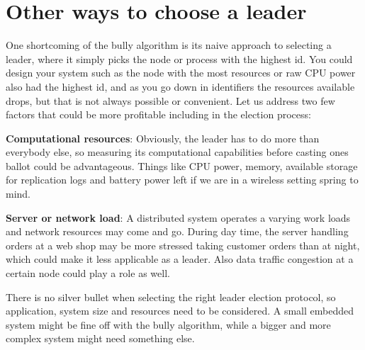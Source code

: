 \section{Other ways to choose a leader}

One shortcoming of the bully algorithm is its naive approach to selecting a leader, where it simply picks the node or process with the highest id. You could design your system such as the node with the most resources or raw CPU power also had the highest id, and as you go down in identifiers the resources available drops, but that is not always possible or convenient. Let us address two few factors that could be more profitable including in the election process:

\noindent \textbf{Computational resources}: Obviously, the leader has to do more than everybody else, so measuring its computational capabilities before casting ones ballot could be advantageous. Things like CPU power, memory, available storage for replication logs and battery power left if we are in a wireless setting spring to mind.

\noindent \textbf{Server or network load}: A distributed system operates a varying work loads and network resources may come and go. During day time, the server handling orders at a web shop may be more stressed taking customer orders than at night, which could make it less applicable as a leader. Also data traffic congestion at a certain node could play a role as well.

\noindent There is no silver bullet when selecting the right leader election protocol, so application, system size and resources need to be considered. A small embedded system might be fine off with the bully algorithm, while a bigger and more complex system might need something else.